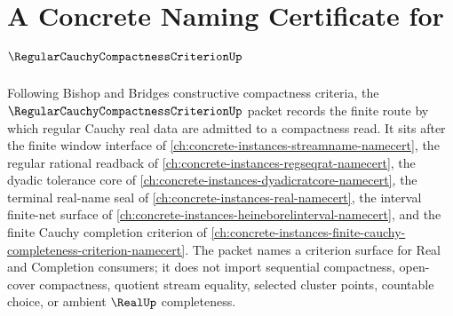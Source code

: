 \chapter{A Concrete Naming Certificate for $\RegularCauchyCompactnessCriterionUp$}
\label{ch:concrete-instances-regular-cauchy-compactness-criterion-namecert}

Following Bishop and Bridges constructive compactness criteria, the $\RegularCauchyCompactnessCriterionUp$ packet records the finite route by which regular Cauchy real data are admitted to a compactness read. It sits after the finite window interface of \autoref{ch:concrete-instances-streamname-namecert}, the regular rational readback of \autoref{ch:concrete-instances-regseqrat-namecert}, the dyadic tolerance core of \autoref{ch:concrete-instances-dyadicratcore-namecert}, the terminal real-name seal of \autoref{ch:concrete-instances-real-namecert}, the interval finite-net surface of \autoref{ch:concrete-instances-heineborelinterval-namecert}, and the finite Cauchy completion criterion of \autoref{ch:concrete-instances-finite-cauchy-completeness-criterion-namecert}. The packet names a criterion surface for Real and Completion consumers; it does not import sequential compactness, open-cover compactness, quotient stream equality, selected cluster points, countable choice, or ambient $\RealUp$ completeness.

